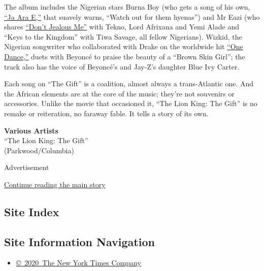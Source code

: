 The album includes the Nigerian stars Burna Boy (who gets a song of his
own, \href{https://www.youtube.com/watch?v=8hlE_Fc2jk4}{``Ja Ara E,''}
that suavely warns, ``Watch out for them hyenas'') and Mr Eazi (who
shares \href{https://www.youtube.com/watch?v=P7xLNmYM8yk}{``Don't
Jealous Me''} with Tekno, Lord Afrixana and Yemi Alade and ``Keys to the
Kingdom'' with Tiwa Savage, all fellow Nigerians). Wizkid, the Nigerian
songwriter who collaborated with Drake on the worldwide hit
\href{https://www.youtube.com/watch?v=vcer12OFU2g}{``One Dance,''} duets
with Beyoncé to praise the beauty of a ``Brown Skin Girl''; the track
also has the voice of Beyoncé's and Jay-Z's daughter Blue Ivy Carter.

Each song on ``The Gift'' is a coalition, almost always a trans-Atlantic
one. And the African elements are at the core of the music; they're not
souvenirs or accessories. Unlike the movie that occasioned it, ``The
Lion King: The Gift'' is no remake or reiteration, no faraway fable. It
tells a story of its own.

\textbf{Various Artists}\\
``The Lion King: The Gift''\\
(Parkwood/Columbia)

Advertisement

\protect\hyperlink{after-bottom}{Continue reading the main story}

\hypertarget{site-index}{%
\subsection{Site Index}\label{site-index}}

\hypertarget{site-information-navigation}{%
\subsection{Site Information
Navigation}\label{site-information-navigation}}

\begin{itemize}
\tightlist
\item
  \href{https://help.nytimes.com/hc/en-us/articles/115014792127-Copyright-notice}{©~2020~The
  New York Times Company}
\end{itemize}

